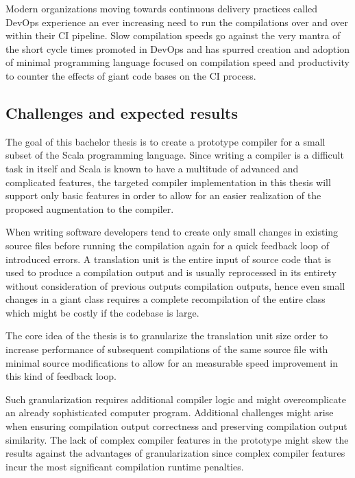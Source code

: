 \documentclass{VUMIFPSbakalaurinis}
\begin{document}
\begin{samepage}
Modern organizations moving towards continuous delivery practices called DevOps \cite{DevOps} experience an ever increasing need to run the compilations over and over within their CI pipeline.
Slow compilation speeds go against the very mantra of the short cycle times promoted in DevOps and has spurred creation and adoption of minimal programming language focused on compilation speed and productivity to counter the effects of giant code bases on the CI process\cite{TheGoProgrammingLanguage, GoGoogle}.

\subsection{Challenges and expected results}
The goal of this bachelor thesis is to create a prototype compiler for a small subset of the Scala programming language.
Since writing a compiler is a difficult task in itself and Scala is known to have a multitude of advanced and complicated features\cite{ScalaSpec}, the targeted compiler implementation in this thesis will support only basic features in order to allow for an easier realization of the proposed augmentation to the compiler.

When writing software developers tend to create only small changes in existing source files before running the compilation again for a quick feedback loop of introduced errors.
A translation unit is the entire input of source code that is used to produce a compilation output and is usually reprocessed in its entirety without consideration of previous outputs compilation outputs, hence even small changes in a giant class requires a complete recompilation of the entire class which might be costly if the codebase is large.

The core idea of the thesis is to granularize the translation unit size order to increase performance of subsequent compilations of the same source file with minimal source modifications to allow for an measurable speed improvement in this kind of feedback loop.

Such granularization requires additional compiler logic and might overcomplicate an already sophisticated computer program.
Additional challenges might arise when ensuring compilation output correctness and preserving compilation output similarity.
The lack of complex compiler features in the prototype might skew the results against the advantages of granularization since complex compiler features incur the most significant compilation runtime penalties.


\end{samepage}
\end{document}
